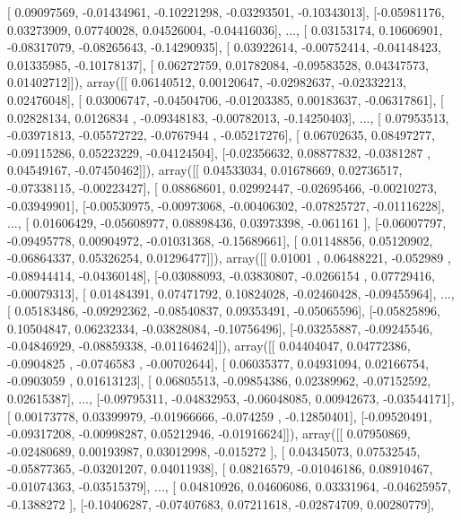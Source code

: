 \documentclass{article}
\begin{document}
       [ 0.09097569, -0.01434961, -0.10221298, -0.03293501, -0.10343013],
       [-0.05981176,  0.03273909,  0.07740028,  0.04526004, -0.04416036],
       ..., 
       [ 0.03153174,  0.10606901, -0.08317079, -0.08265643, -0.14290935],
       [ 0.03922614, -0.00752414, -0.04148423,  0.01335985, -0.10178137],
       [ 0.06272759,  0.01782084, -0.09583528,  0.04347573,  0.01402712]]), array([[ 0.06140512,  0.00120647, -0.02982637, -0.02332213,  0.02476048],
       [ 0.03006747, -0.04504706, -0.01203385,  0.00183637, -0.06317861],
       [ 0.02828134,  0.0126834 , -0.09348183, -0.00782013, -0.14250403],
       ..., 
       [ 0.07953513, -0.03971813, -0.05572722, -0.0767944 , -0.05217276],
       [ 0.06702635,  0.08497277, -0.09115286,  0.05223229, -0.04124504],
       [-0.02356632,  0.08877832, -0.0381287 ,  0.04549167, -0.07450462]]), array([[ 0.04533034,  0.01678669,  0.02736517, -0.07338115, -0.00223427],
       [ 0.08868601,  0.02992447, -0.02695466, -0.00210273, -0.03949901],
       [-0.00530975, -0.00973068, -0.00406302, -0.07825727, -0.01116228],
       ..., 
       [ 0.01606429, -0.05608977,  0.08898436,  0.03973398, -0.061161  ],
       [-0.06007797, -0.09495778,  0.00904972, -0.01031368, -0.15689661],
       [ 0.01148856,  0.05120902, -0.06864337,  0.05326254,  0.01296477]]), array([[ 0.01001   ,  0.06488221, -0.052989  , -0.08944414, -0.04360148],
       [-0.03088093, -0.03830807, -0.0266154 ,  0.07729416, -0.00079313],
       [ 0.01484391,  0.07471792,  0.10824028, -0.02460428, -0.09455964],
       ..., 
       [ 0.05183486, -0.09292362, -0.08540837,  0.09353491, -0.05065596],
       [-0.05825896,  0.10504847,  0.06232334, -0.03828084, -0.10756496],
       [-0.03255887, -0.09245546, -0.04846929, -0.08859338, -0.01164624]]), array([[ 0.04404047,  0.04772386, -0.0904825 , -0.0746583 , -0.00702644],
       [ 0.06035377,  0.04931094,  0.02166754, -0.0903059 ,  0.01613123],
       [ 0.06805513, -0.09854386,  0.02389962, -0.07152592,  0.02615387],
       ..., 
       [-0.09795311, -0.04832953, -0.06048085,  0.00942673, -0.03544171],
       [ 0.00173778,  0.03399979, -0.01966666, -0.074259  , -0.12850401],
       [-0.09520491, -0.09317208, -0.00998287,  0.05212946, -0.01916624]]), array([[ 0.07950869, -0.02480689,  0.00193987,  0.03012998, -0.015272  ],
       [ 0.04345073,  0.07532545, -0.05877365, -0.03201207,  0.04011938],
       [ 0.08216579, -0.01046186,  0.08910467, -0.01074363, -0.03515379],
       ..., 
       [ 0.04810926,  0.04606086,  0.03331964, -0.04625957, -0.1388272 ],
       [-0.10406287, -0.07407683,  0.07211618, -0.02874709,  0.00280779],
\end{document}

